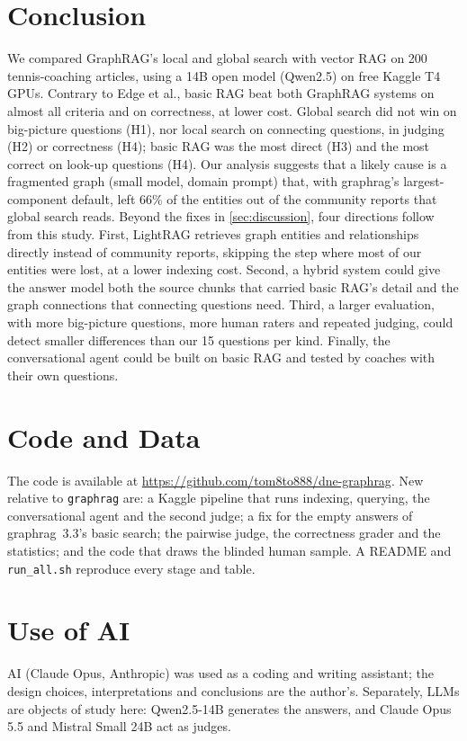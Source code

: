 \documentclass{article}
\begin{document}
\section{Conclusion}
\label{sec:conclusion}

We compared GraphRAG's local and global search with vector RAG on 200 tennis-coaching articles, using
a 14B open model (Qwen2.5) on free Kaggle T4 GPUs. Contrary to Edge et al., basic RAG beat both
GraphRAG systems on almost all criteria and on correctness, at lower cost. Global search did not win on big-picture questions (H1), nor local search on
connecting questions, in judging (H2) or correctness (H4); basic RAG was the most direct (H3) and the most correct on look-up questions (H4). Our analysis suggests that a likely cause is a fragmented graph (small model,
domain prompt) that, with graphrag's largest-component default, left 66\% of the entities out of the
community reports that global search reads.
Beyond the fixes in \cref{sec:discussion}, four directions follow from this study. First, LightRAG
\cite{guo2024lightrag} retrieves graph entities and relationships directly instead of community reports,
skipping the step where most of our entities were lost, at a lower indexing cost. Second, a hybrid
system could give the answer model both the source chunks that carried basic RAG's detail and the graph
connections that connecting questions need. Third, a larger evaluation, with more big-picture questions,
more human raters and repeated judging, could detect smaller differences than our 15 questions per kind.
Finally, the conversational agent could be built on basic RAG and tested by coaches with their own
questions.

\section*{Code and Data}
\label{sec:code}
The code is available at \url{https://github.com/tom8to888/dne-graphrag}. New relative to \texttt{graphrag} are:
a Kaggle pipeline that runs indexing, querying, the conversational agent and the
second judge; a fix for the empty answers of graphrag~3.3's basic search; the pairwise judge, the
correctness grader and the statistics; and the code that draws the blinded human sample. A README and
\texttt{run\_all.sh} reproduce every stage and table.




\section*{Use of AI}
AI (Claude Opus, Anthropic) was used as a coding and writing assistant; the design choices, interpretations and conclusions are the author's.
Separately, LLMs are objects of study here: Qwen2.5-14B generates the answers, and Claude Opus 5.5
and Mistral Small 24B act as judges.
\end{document}
